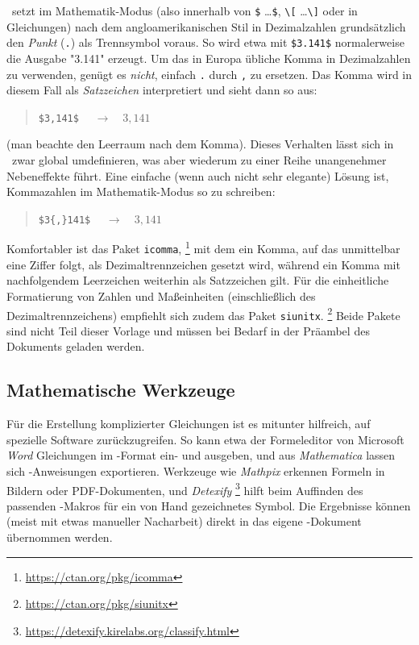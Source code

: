 \latex\ setzt im Mathematik-Modus (also innerhalb von \verb!$! \ldots \verb!$!,
\verb!\[! \ldots \verb!\]! oder in Gleichungen) nach dem angloamerikanischen
Stil in Dezimalzahlen grundsätzlich den \emph{Punkt} (\verb!.!) als Trennsymbol
voraus. So wird etwa mit \verb!$3.141$! normalerweise die Ausgabe "3.141"
erzeugt. Um das in Europa übliche Komma in Dezimalzahlen zu verwenden, genügt
es \emph{nicht}, einfach \verb!.! durch \verb!,! zu ersetzen. Das Komma wird
in diesem Fall als \emph{Satzzeichen} interpretiert und sieht dann so aus:
%
\begin{quote}
	\verb!$3,141$! $\quad \rightarrow \quad 3,141$
\end{quote}
%
(man beachte den Leerraum nach dem Komma). Dieses Verhalten lässt sich in
\latex\ zwar global umdefinieren, was aber wiederum zu einer Reihe
unangenehmer Nebeneffekte führt. Eine einfache (wenn auch nicht sehr
elegante) Lösung ist, Kommazahlen im Mathematik-Modus so zu schreiben:
%
\begin{quote}
	\verb!$3{,}141$! $\quad \rightarrow \quad 3{,}141$
\end{quote}
%
Komfortabler ist das Paket \texttt{icomma},%
\footnote{\url{https://ctan.org/pkg/icomma}}
mit dem ein Komma, auf das unmittelbar eine Ziffer folgt, als
Dezimaltrennzeichen gesetzt wird, während ein Komma mit nachfolgendem
Leerzeichen weiterhin als Satzzeichen gilt. Für die einheitliche Formatierung
von Zahlen und Maßeinheiten (einschließlich des Dezimaltrennzeichens)
empfiehlt sich zudem das Paket \texttt{siunitx}.%
\footnote{\url{https://ctan.org/pkg/siunitx}}
Beide Pakete sind nicht Teil dieser Vorlage und müssen bei Bedarf in der
Präambel des Dokuments geladen werden.


\subsection{Mathematische Werkzeuge}

Für die Erstellung komplizierter Gleichungen ist es mitunter hilfreich, auf
spezielle Software zurückzugreifen. So kann etwa der Formeleditor von
Microsoft \emph{Word} Gleichungen im \latex-Format ein- und ausgeben, und aus
\emph{Mathematica} lassen sich \latex-An\-wei\-sun\-gen exportieren. Werkzeuge
wie \emph{Mathpix} erkennen Formeln in Bildern oder PDF-Dokumenten, und
\emph{Detexify}%
\footnote{\url{https://detexify.kirelabs.org/classify.html}}
hilft beim Auffinden des passenden \latex-Makros für ein von Hand gezeichnetes
Symbol. Die Ergebnisse können (meist mit etwas manueller Nacharbeit) direkt in
das eigene \latex-Dokument übernommen werden.


